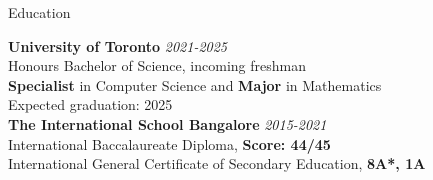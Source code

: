 \documentclass{resume} %
\begin{document}

\begin{rSection}{Education}

{\bf University of Toronto} \hfill {\em 2021-2025} \\ 
Honours Bachelor of Science, incoming freshman \\
\textbf{Specialist} in Computer Science and \textbf{Major} in Mathematics \smallskip \\
Expected graduation: 2025  \\

{\bf The International School Bangalore} \hfill {\em 2015-2021} \\ 
International Baccalaureate Diploma, \textbf{Score: 44/45}  \\
International General Certificate of Secondary Education, \textbf{8A*, 1A}\\

\end{rSection}

\end{document}
